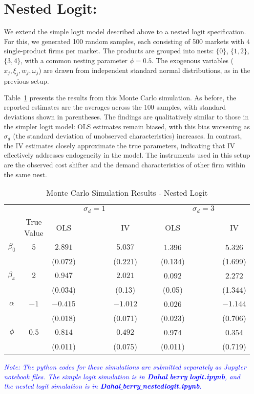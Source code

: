 \documentclass[12pt]{article}
\begin{document}
\section{Nested Logit:}
We extend the simple logit model described above to a nested logit specification. For this, we generated 100 random samples, each consisting of 500 markets with 4 single-product firms per market. The products are grouped into nests: $\{0\}$, $\{1,2\}$, $\{3,4\}$, with a common nesting parameter $\phi = 0.5$. The exogenous variables ($x_j, \xi_j, w_j, \omega_j$) are drawn from independent standard normal distributions, as in the previous setup.

Table~\ref{tab2} presents the results from this Monte Carlo simulation. As before, the reported estimates are the averages across the 100 samples, with standard deviations shown in parentheses. The findings are qualitatively similar to those in the simpler logit model: OLS estimates remain biased, with this bias worsening as $\sigma_d$ (the standard deviation of unobserved characteristics) increases. In contrast, the IV estimates closely approximate the true parameters, indicating that IV effectively addresses endogeneity in the model. The instruments used in this setup are the observed cost shifter and the demand characteristics of other firm within the same nest.

\begin{table}[H]
    \centering
    \begin{tabular}{cccccccccc}
        \hline
        &            &     & $\sigma_d = 1$ &  & & & & $\sigma_d = 3$\\
        \hdashline
        & True Value & OLS & & IV & & & OLS & & IV \\
        \hline
        $\beta_0$ & $5$ & $2.891$ &  & $5.037$  & & & 1.396 & & 5.326\\
                  &     & (0.072) &  & (0.221) & & & (0.134) & & (1.699) \\
        $\beta_x$ & $2$ & $0.947$ &  & $2.021$ & & & 0.092 & & 2.272\\
                  &     & (0.034) &  & (0.13) & & & (0.05) & & (1.344)\\
        $\alpha$ & $-1$ & $-0.415$ &  & $-1.012$ & & & 0.026 & & $-1.144$\\
                &       & (0.018)  &  & (0.071) & &  & (0.023) & & (0.706) \\
        $\phi$ & $0.5$ & $0.814$ &  & $0.492$ & & & 0.974 & & 0.354\\
                &       & (0.011)  &  & (0.075) & &  & (0.011) & & (0.719) \\
        \hline
        \end{tabular}
    \caption{Monte Carlo Simulation Results - Nested Logit}
    \label{tab2}
\end{table}

\printbibliography

\tiny\textcolor{blue}{\textit{Note: The python codes for these simulations are submitted separately as Jupyter notebook files. The simple logit simulation is in \textbf{Dahal$\_$berry$\_$logit.ipynb}, and the nested logit simulation is in \textbf{Dahal$\_$berry$\_$nestedlogit.ipynb}.}}
\end{document}
